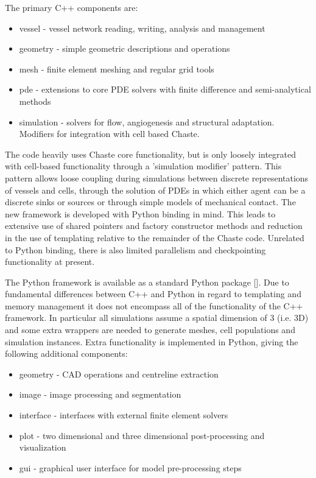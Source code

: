 \documentclass[superscriptaddress, a4paper]{article}
\begin{document}
The primary C++ components are:

\begin{itemize}
 \item vessel - vessel network reading, writing, analysis and management
 \item geometry - simple geometric descriptions and operations
 \item mesh - finite element meshing and regular grid tools
 \item pde - extensions to core PDE solvers with finite difference and semi-analytical methods
 \item simulation - solvers for flow, angiogenesis and structural adaptation. Modifiers for integration with cell based Chaste.
\end{itemize}

The code heavily uses Chaste core functionality, but is only loosely integrated with cell-based functionality through a 'simulation modifier' pattern. This pattern allows loose coupling during simulations between discrete representations of vessels and cells, through the solution of PDEs in which either agent can be a discrete sinks or sources or through simple models of mechanical contact. The new framework is developed with Python binding in mind. This leads to extensive use of shared pointers and factory constructor methods and reduction in the use of templating relative to the remainder of the Chaste code. Unrelated to Python binding, there is also limited parallelism and checkpointing functionality at present.

The Python framework is available as a standard Python package []. Due to fundamental differences between C++ and Python in regard to templating and memory management it does not encompass all of the functionality of the C++ framework. In particular all simulations assume a spatial dimension of 3 (i.e. 3D) and some extra wrappers are needed to generate meshes, cell populations and simulation instances. Extra functionality is implemented in Python, giving the following additional components:

\begin{itemize}
 \item geometry - CAD operations and centreline extraction
 \item image - image processing and segmentation
 \item interface - interfaces with external finite element solvers
 \item plot - two dimensional and three dimensional post-processing and visualization
 \item gui - graphical user interface for model pre-processing steps
\end{itemize}
\end{document}
